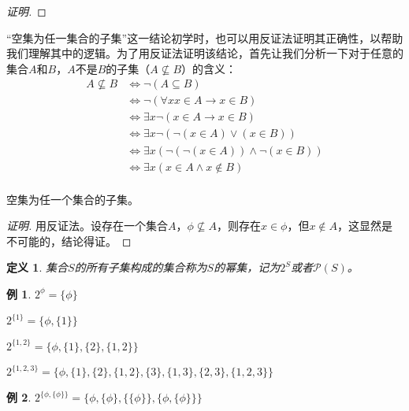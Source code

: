 \documentclass{book}[oneside]
\newtheorem{Def}{定义}[chapter]
\newtheorem*{Example}{例}
\begin{document}
\begin{CJK*}{UTF8}{gbsn}
\begin{proof}[证明]
\end{proof}

“空集为任一集合的子集”这一结论初学时，也可以用反证法证明其正确性，以帮助我们理解其中的逻辑。为了用反证法证明该结论，首先让我们分析一下对于任意的集合$A$和$B$，$A$不是$B$的子集（$A\nsubseteq B$）的含义：
\begin{equation*}
  \begin{split}
    A\nsubseteq B &\Leftrightarrow \lnot(A \subseteq B)\\
    &\Leftrightarrow \lnot( \forall x x \in A \to x \in B)\\
    &\Leftrightarrow \exists x \lnot(x \in A \to x \in B)\\
    &\Leftrightarrow \exists x \lnot( \lnot (x \in A) \lor (x \in B))\\
    &\Leftrightarrow \exists x (\lnot( \lnot (x \in A)) \land \lnot ( x \in B))\\
    &\Leftrightarrow \exists x (x \in A \land x \notin B)\\
  \end{split}
\end{equation*}


   空集为任一个集合的子集。 
 \begin{proof}[证明]
   用反证法。设存在一个集合$A$，$\phi \nsubseteq A$，则存在$x\in \phi$，但$x \notin A$，这显然是不可能的，结论得证。   
 \end{proof}  
\begin{Def}
  集合$S$的所有子集构成的集合称为$S$的幂集，记为$2^S$或者$\mathcal{P}(S)$。
\end{Def}
\begin{Example}
      $2^{\phi}=\{\phi\}$

    $2^{\{1\}}=\{\phi, \{1\}\}$

  $2^{\{1,2\}}=\{\phi, \{1\},\{2\},\{1,2\}\}$
  
  $2^{\{1,2,3\}}=\{\phi, \{1\},\{2\},\{1,2\},\{3\},\{1,3\},\{2,3\},\{1,2,3\}\}$
\end{Example}

\begin{Example}
  $2^{\{\phi, \{\phi\}\}}=\{\phi, \{\phi\},\{\{\phi\}\}, \{\phi, \{\phi\}\}\}$
\end{Example}


\end{CJK*}
\end{document}
